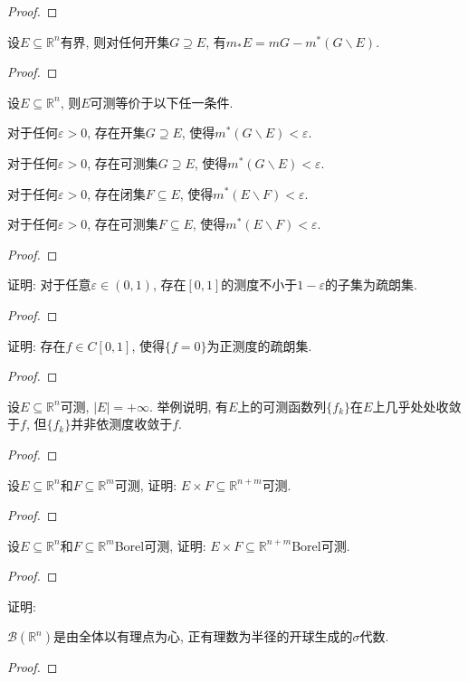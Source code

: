 \begin{quiza}
\begin{proof}
\end{proof}
\woe 设\(E\subseteq\mathbb{R}^n\)有界, 则对任何开集\(G\supseteq E\), 有\(m_*E=mG-m^*(G\backslash E)\).
\begin{proof}
	
\end{proof}
\woe 设\(E\subseteq\mathbb{R}^n\), 则\(E\)可测等价于以下任一条件.
\begin{compactenum}[(1)]
\item 对于任何\(\varepsilon>0\), 存在开集\(G\supseteq E\), 使得\(m^*(G\backslash E)<\varepsilon\).
\item 对于任何\(\varepsilon>0\), 存在可测集\(G\supseteq E\), 使得\(m^*(G\backslash E)<\varepsilon\).
\item 对于任何\(\varepsilon>0\), 存在闭集\(F\subseteq E\), 使得\(m^*(E\backslash F)<\varepsilon\).
\item 对于任何\(\varepsilon>0\), 存在可测集\(F\subseteq E\), 使得\(m^*(E\backslash F)<\varepsilon\).
\end{compactenum}
\begin{proof}
	
\end{proof}
\woe 证明: 对于任意\(\varepsilon\in(0,1)\), 存在\([0,1]\)的测度不小于\(1-\varepsilon\)的子集为疏朗集.
\begin{proof}
	
\end{proof}
\woe 证明: 存在\(f\in C[0,1]\), 使得\(\{f=0\}\)为正测度的疏朗集.
\begin{proof}
	
\end{proof}
\woe 设\(E\subseteq\mathbb{R}^n\)可测, \(|E|=+\infty\). 举例说明, 有\(E\)上的可测函数列\(\{f_k\}\)在\(E\)上几乎处处收敛于\(f\), 但\(\{f_k\}\)并非依测度收敛于\(f\).
\begin{proof}
	
\end{proof}
\woe 设\(E\subseteq\mathbb{R}^n\)和\(F\subseteq\mathbb{R}^m\)可测, 证明: \(E\times F\subseteq\mathbb{R}^{n+m}\)可测.
\begin{proof}
	
\end{proof}
\woe 设\(E\subseteq\mathbb{R}^n\)和\(F\subseteq\mathbb{R}^m\)Borel可测, 证明: \(E\times F\subseteq\mathbb{R}^{n+m}\)Borel可测.
\begin{proof}
	
\end{proof}
\woe 证明:\begin{quizs}
\item \(\mathscr{B}(\mathbb{R}^n)\)是由全体以有理点为心, 正有理数为半径的开球生成的\(\sigma\)代数.
\begin{proof}
	

\end{proof}
\end{quizs}
\end{quiza}
